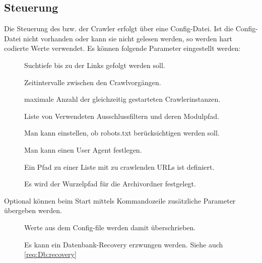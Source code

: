 \subsection{Steuerung}
\begin{description}
    \label{spec:conf}
	\item [\req{Config-file}{conf}]
		Die Steuerung des bzw. der Crawler erfolgt über eine Config-Datei.
		Ist die Config-Datei nicht vorhanden oder kann sie nicht gelesen werden,
        so werden hart codierte Werte verwendet.
		Es können folgende Parameter eingestellt werden:
		\begin{description}
			\item []
				Suchtiefe bis zu der Links gefolgt werden soll.
			\item []
				Zeitintervalle zwischen den Crawlvorgängen.
			\item []
				maximale Anzahl der gleichzeitig gestarteten Crawlerinstanzen.
			\item []
				Liste von Verwendeten Ausschlussfiltern und deren Modulpfad.
			\item []
				Man kann einstellen, ob robots.txt berücksichtigen werden soll.
			\item []
				Man kann einen User Agent festlegen.
			\item []
                Ein Pfad zu einer Liste mit zu crawlenden URLs ist definiert.
			\item []
				Es wird der Wurzelpfad für die Archivordner festgelegt.
		\end{description}
	\item [\req{Kommandozeileninterface}{cmd}]
		Optional können beim Start mittels Kommandozeile zusätzliche Parameter übergeben werden.
		\begin{description}
			\item []
				Werte aus dem Config-file werden damit überschrieben.
			\item []
				Es kann ein Datenbank-Recovery erzwungen werden. Siehe auch \ref{req:Db:recovery}
		\end{description}
\end{description}

